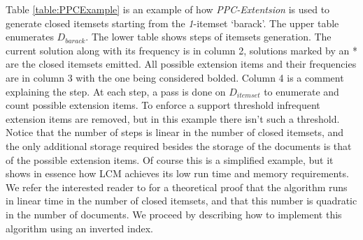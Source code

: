 \documentclass{sig-alternate}
\begin{document}


Table \ref{table:PPCExample} is an example of how \emph{PPC-Extentsion} is used to generate closed itemsets starting from the  \emph{1}-itemset `barack'. The upper table enumerates $D_{barack}$. %
The lower table shows steps of itemsets generation. The current solution along with its frequency is in column 2, solutions marked by an * are the closed itemsets emitted. All possible extension items and their frequencies are in column 3 with the one being considered bolded. Column 4 is a comment explaining the step. At each step, a pass is done on $D_{itemset}$ to enumerate and count possible extension items.
To enforce a support threshold infrequent extension items are removed, but in this example there isn't such a threshold. Notice that the number of steps is linear in the number of closed itemsets, and the only additional storage required besides the storage of the documents is that of the possible extension items. Of course this is a simplified example, but it shows in essence how LCM achieves its low run time and memory requirements. We refer the interested reader to \cite{lcm} for a theoretical proof that the algorithm runs in linear time in the number of closed itemsets, and that this number is quadratic in the number of documents. We proceed by describing how to implement this algorithm using an inverted index.

\end{document}
